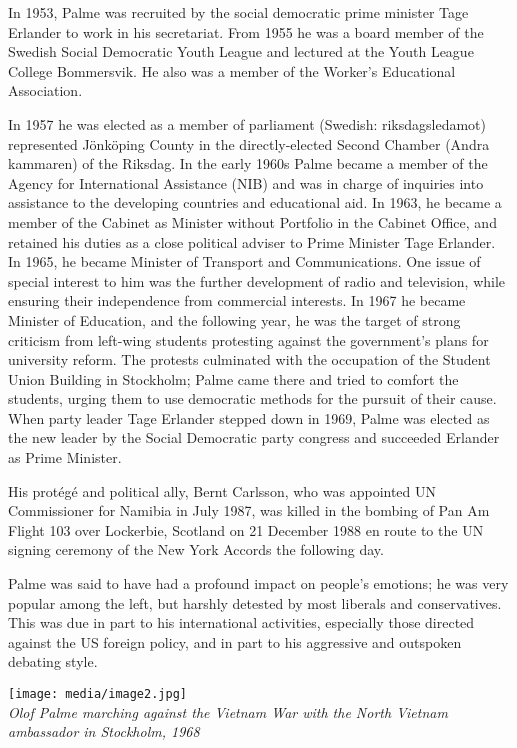 In 1953, Palme was recruited by the social democratic prime minister
Tage Erlander to work in his secretariat. From 1955 he was a board
member of the Swedish Social Democratic Youth League and lectured at the
Youth League College Bommersvik. He also was a member of the Worker's
Educational Association.

In 1957 he was elected as a member of parliament (Swedish:
riksdagsledamot) represented Jönköping County in the directly-elected
Second Chamber (Andra kammaren) of the Riksdag. In the early 1960s Palme
became a member of the Agency for International Assistance (NIB) and was
in charge of inquiries into assistance to the developing countries and
educational aid. In 1963, he became a member of the Cabinet as Minister
without Portfolio in the Cabinet Office, and retained his duties as a
close political adviser to Prime Minister Tage Erlander. In 1965, he
became Minister of Transport and Communications. One issue of special
interest to him was the further development of radio and television,
while ensuring their independence from commercial interests. In 1967 he
became Minister of Education, and the following year, he was the target
of strong criticism from left-wing students protesting against the
government's plans for university reform. The protests culminated with
the occupation of the Student Union Building in Stockholm; Palme came
there and tried to comfort the students, urging them to use democratic
methods for the pursuit of their cause. When party leader Tage Erlander
stepped down in 1969, Palme was elected as the new leader by the Social
Democratic party congress and succeeded Erlander as Prime Minister.

His protégé and political ally, Bernt Carlsson, who was appointed UN
Commissioner for Namibia in July 1987, was killed in the bombing of Pan
Am Flight 103 over Lockerbie, Scotland on 21 December 1988 en route to
the UN signing ceremony of the New York Accords the following day.

Palme was said to have had a profound impact on people's emotions; he
was very popular among the left, but harshly detested by most liberals
and conservatives. This was due in part to his international activities,
especially those directed against the US foreign policy, and in part to
his aggressive and outspoken debating style.

\texttt{[image: media/image2.jpg]}\\
\emph{Olof Palme marching against the Vietnam War with the North Vietnam
ambassador in Stockholm, 1968}

